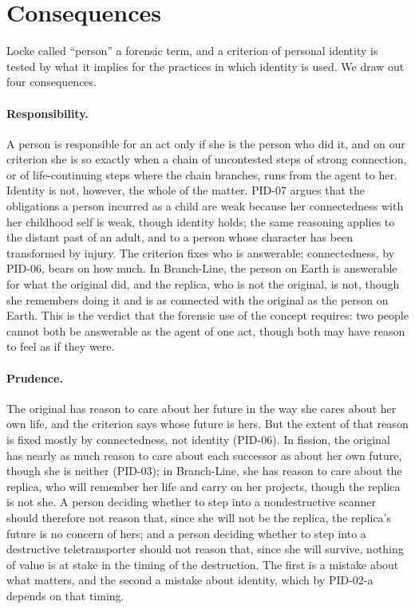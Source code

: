 \documentclass{situationist-preprint}
\begin{document}
\section{Consequences}\label{s:consequences}

Locke called \enquote{person} a forensic term, and a criterion of personal identity is tested by what it implies for the practices in which identity is used. We draw out four consequences.

\paragraph{Responsibility.} A person is responsible for an act only if she is the person who did it, and on our criterion she is so exactly when a chain of uncontested steps of strong connection, or of life-continuing steps where the chain branches, runs from the agent to her. Identity is not, however, the whole of the matter. PID-07 argues that the obligations a person incurred as a child are weak because her connectedness with her childhood self is weak, though identity holds; the same reasoning applies to the distant past of an adult, and to a person whose character has been transformed by injury. The criterion fixes who is answerable; connectedness, by PID-06, bears on how much. In Branch-Line, the person on Earth is answerable for what the original did, and the replica, who is not the original, is not, though she remembers doing it and is as connected with the original as the person on Earth. This is the verdict that the forensic use of the concept requires: two people cannot both be answerable as the agent of one act, though both may have reason to feel as if they were.

\paragraph{Prudence.} The original has reason to care about her future in the way she cares about her own life, and the criterion says whose future is hers. But the extent of that reason is fixed mostly by connectedness, not identity (PID-06). In fission, the original has nearly as much reason to care about each successor as about her own future, though she is neither (PID-03); in Branch-Line, she has reason to care about the replica, who will remember her life and carry on her projects, though the replica is not she. A person deciding whether to step into a nondestructive scanner should therefore not reason that, since she will not be the replica, the replica's future is no concern of hers; and a person deciding whether to step into a destructive teletransporter should not reason that, since she will survive, nothing of value is at stake in the timing of the destruction. The first is a mistake about what matters, and the second a mistake about identity, which by PID-02-a depends on that timing.
\end{document}
